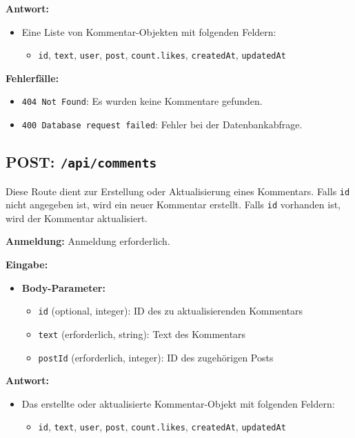 \documentclass[a4paper,12pt]{article}
\begin{document}
\textbf{Antwort:}
\begin{itemize}
    \item Eine Liste von Kommentar-Objekten mit folgenden Feldern:
    \begin{itemize}
        \item \texttt{id}, \texttt{text}, \texttt{user}, \texttt{post}, \texttt{count.likes}, \texttt{createdAt}, \texttt{updatedAt}
    \end{itemize}
\end{itemize}

\textbf{Fehlerfälle:}
\begin{itemize}
    \item \texttt{404 Not Found}: Es wurden keine Kommentare gefunden.
    \item \texttt{400 Database request failed}: Fehler bei der Datenbankabfrage.
\end{itemize}

\newpage
\subsection{POST: \texttt{/api/comments}}

Diese Route dient zur Erstellung oder Aktualisierung eines Kommentars. Falls \texttt{id} nicht angegeben ist, wird ein neuer Kommentar erstellt. Falls \texttt{id} vorhanden ist, wird der Kommentar aktualisiert.

\textbf{Anmeldung:} Anmeldung erforderlich.

\textbf{Eingabe:}
\begin{itemize}
    \item \textbf{Body-Parameter:}
    \begin{itemize}
        \item \texttt{id} (optional, integer): ID des zu aktualisierenden Kommentars
        \item \texttt{text} (erforderlich, string): Text des Kommentars
        \item \texttt{postId} (erforderlich, integer): ID des zugehörigen Posts
    \end{itemize}
\end{itemize}

\textbf{Antwort:}
\begin{itemize}
    \item Das erstellte oder aktualisierte Kommentar-Objekt mit folgenden Feldern:
    \begin{itemize}
        \item \texttt{id}, \texttt{text}, \texttt{user}, \texttt{post}, \texttt{count.likes}, \texttt{createdAt}, \texttt{updatedAt}
    \end{itemize}
\end{itemize}
\end{document}
